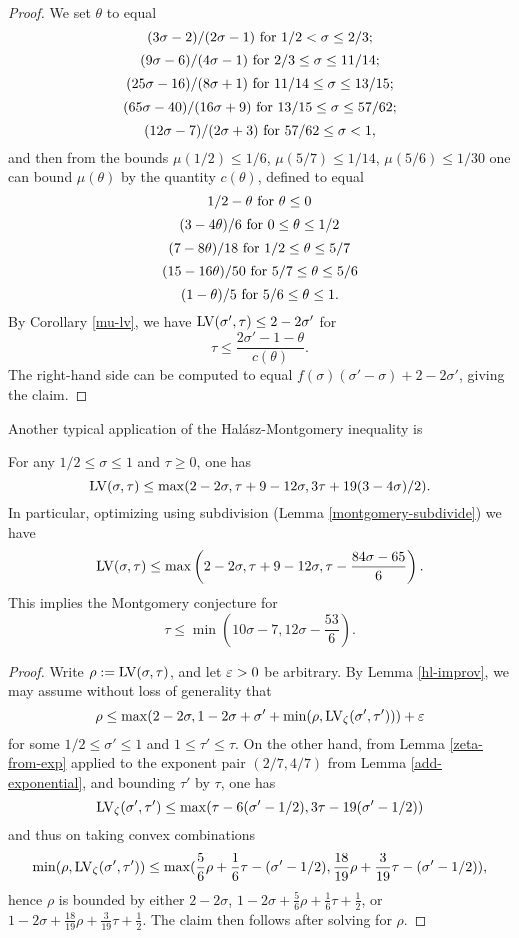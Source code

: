 \begin{proof} We set $\theta$ to equal
$$ (3\sigma-2)/(2\sigma-1) \hbox{ for } 1/2 < \sigma \leq 2/3;$$
$$ (9\sigma-6)/(4\sigma-1) \hbox{ for } 2/3 \leq \sigma \leq 11/14;$$
$$ (25\sigma-16)/(8\sigma+1) \hbox{ for } 11/14 \leq \sigma \leq 13/15;$$
$$ (65\sigma-40)/(16\sigma+9) \hbox{ for } 13/15 \leq \sigma \leq 57/62;$$
$$ (12\sigma-7)/(2\sigma+3) \hbox{ for } 57/62 \leq \sigma < 1,$$
and then from the bounds $\mu(1/2) \leq 1/6$, $\mu(5/7) \leq 1/14$, $\mu(5/6) \leq 1/30$ one can bound $\mu(\theta)$ by the quantity $c(\theta)$, defined to equal
$$ 1/2 - \theta \hbox{ for } \theta \leq 0$$
$$ (3-4\theta)/6 \hbox{ for } 0 \leq \theta \leq 1/2$$
$$ (7-8\theta)/18 \hbox{ for } 1/2 \leq \theta \leq 5/7$$
$$ (15-16\theta)/50 \hbox{ for } 5/7 \leq \theta \leq 5/6$$
$$ (1-\theta)/5 \hbox{ for } 5/6 \leq \theta \leq 1.$$
By Corollary \ref{mu-lv}, we have $\mathrm{LV}(\sigma',\tau) \leq 2-2\sigma'$ for
$$ \tau \leq \frac{2\sigma'-1-\theta}{c(\theta)}.$$
The right-hand side can be computed to equal $f(\sigma)(\sigma'-\sigma) + 2 - 2\sigma'$, giving the claim.
\end{proof}

Another typical application of the Hal\'asz-Montgomery inequality is

\begin{lemma}\label{ivic-lvt}\cite[(11.40)]{ivic}  For any $1/2 \leq \sigma \leq 1$ and $\tau \geq 0$, one has
    $$ \mathrm{LV}(\sigma,\tau) \leq \max( 2-2\sigma, \tau + 9-12\sigma, 3\tau + 19(3-4\sigma)/2).$$
    In particular, optimizing using subdivision (Lemma \ref{montgomery-subdivide}) we have
    $$ \mathrm{LV}(\sigma,\tau) \leq \max\left( 2-2\sigma, \tau + 9-12\sigma, \tau - \frac{84\sigma-65}{6}\right).$$
    This implies the Montgomery conjecture for
    $$ \tau \leq \min( 10\sigma-7, 12 \sigma - \frac{53}{6}).$$
\end{lemma}

\begin{proof}  Write $\rho := \mathrm{LV}(\sigma,\tau)$, and let $\varepsilon>0$ be arbitrary. By Lemma \ref{hl-improv}, we may assume without loss of generality that
    $$ \rho \leq \max( 2-2\sigma, 1-2\sigma + \sigma' + \min( \rho, \mathrm{LV}_\zeta(\sigma',\tau')) ) + \varepsilon$$
    for some $1/2 \leq \sigma' \leq 1$ and $1 \leq \tau' \leq \tau$.  On the other hand, from Lemma \ref{zeta-from-exp} applied to the exponent pair $(2/7,4/7)$ from Lemma \ref{add-exponential}, and bounding $\tau'$ by $\tau$, one has
    $$ \mathrm{LV}_\zeta(\sigma',\tau') \leq \max( \tau-6(\sigma'-1/2), 3\tau - 19(\sigma'-1/2))$$
    and thus on taking convex combinations
    $$ \min(\rho,\mathrm{LV}_\zeta(\sigma',\tau')) \leq \max( \frac{5}{6}\rho + \frac{1}{6} \tau - (\sigma'-1/2), \frac{18}{19} \rho + \frac{3}{19} \tau - (\sigma'-1/2) ),$$
    hence $\rho$ is bounded by either $2 - 2 \sigma$, $1 - 2\sigma + \frac{5}{6}\rho + \frac{1}{6} \tau + \frac{1}{2}$, or $1-2\sigma + \frac{18}{19} \rho + \frac{3}{19} \tau + \frac{1}{2}$.  The claim then follows after solving for $\rho$.
\end{proof}
